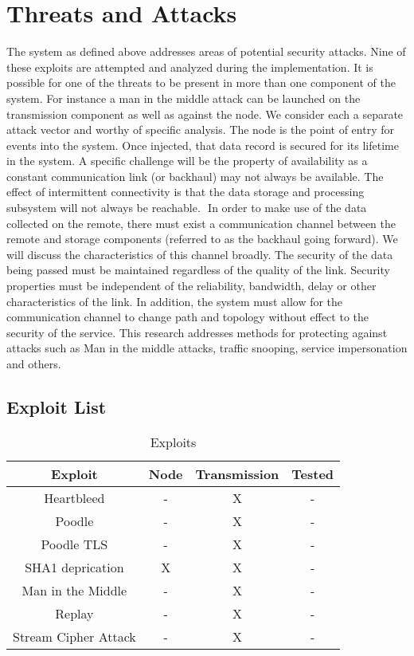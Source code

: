 \chapter{Threats and Attacks}

The system as defined above addresses areas of potential security attacks. Nine of these exploits are attempted and analyzed during the implementation. It is possible for one of the threats to be present in more than one component of the system. For instance a man in the middle attack can be launched on the transmission component as well as against the node. We consider each a separate attack vector and worthy of specific analysis.
The node is the point of entry for events into the system. Once injected, that data record is secured for its lifetime in the system. A specific challenge will be the property of availability as a constant communication link (or backhaul) may not always be available. The effect of intermittent connectivity is that the data storage and processing subsystem will not always be reachable. 
 In order to make use of the data collected on the remote, there must exist a communication channel between the remote and storage components (referred to as the backhaul going forward). We will discuss the characteristics of this channel broadly. The security of the data being passed must be maintained regardless of the quality of the link. Security properties must be independent of the reliability, bandwidth, delay or other characteristics of the link. In addition, the system must allow for the communication channel to change path and topology without effect to the security of the service. This research addresses methods for protecting against attacks such as Man in the middle attacks, traffic snooping, service impersonation and others.

\section{Exploit List}

\begin{table}[ ]
\centering
\begin{tabular}{c|c|c|c}
 \bf Exploit & \bf Node & \bf Transmission & \bf Tested\\
 \hline
      Heartbleed              &  - &  X & -\\
      Poodle                  &  - &  X & -\\
      Poodle TLS              &  - &  X & -\\
      SHA1 deprication        &  X &  X & -\\
      Man in the Middle       &  - &  X & -\\
      Replay                  &  - &  X & -\\
      Stream Cipher Attack    &  - &  X & -\\
 \hline
\end{tabular}
\caption{Exploits}
\label{tab:exploits}
\end{table}

